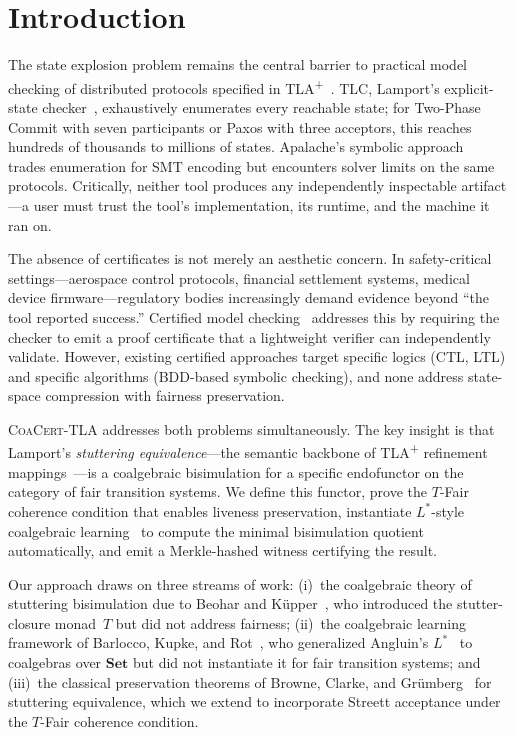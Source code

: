 \documentclass[11pt]{article}
\newcommand{\Set}{\mathbf{Set}}
\newcommand{\TFair}{$T$-Fair}
\newcommand{\CoaCert}{\textsc{CoaCert-TLA}}
\newcommand{\TLAplus}{TLA\textsuperscript{+}}
\begin{document}
\section{Introduction}
\label{sec:intro}

The state explosion problem remains the central barrier to practical model
checking of distributed protocols specified in \TLAplus{}~\cite{Lamport02}.
TLC, Lamport's explicit-state checker~\cite{TLC}, exhaustively enumerates
every reachable state; for Two-Phase Commit with seven participants or
Paxos with three acceptors, this reaches hundreds of thousands to millions
of states.
Apalache's symbolic approach~\cite{Apalache} trades enumeration for SMT
encoding but encounters solver limits on the same protocols.
Critically, neither tool produces any independently inspectable
artifact---a user must trust the tool's implementation, its runtime, and the
machine it ran on.

The absence of certificates is not merely an aesthetic concern.
In safety-critical settings---aerospace control protocols, financial
settlement systems, medical device firmware---regulatory bodies increasingly
demand evidence beyond ``the tool reported success.''
Certified model checking~\cite{Namjoshi01} addresses this by requiring the
checker to emit a proof certificate that a lightweight verifier can
independently validate.
However, existing certified approaches target specific logics (CTL, LTL)
and specific algorithms (BDD-based symbolic checking), and none address
state-space compression with fairness preservation.

\CoaCert{} addresses both problems simultaneously.
The key insight is that Lamport's \emph{stuttering equivalence}---the semantic
backbone of \TLAplus{} refinement mappings~\cite{Lamport94}---is a
coalgebraic bisimulation for a specific endofunctor on the category of fair
transition systems.
We define this functor, prove the \TFair{} coherence condition that enables
liveness preservation, instantiate $L^*$-style coalgebraic
learning~\cite{BarloccoKR19} to compute the minimal bisimulation quotient
automatically, and emit a Merkle-hashed witness certifying the result.

Our approach draws on three streams of work:
(i)~the coalgebraic theory of stuttering bisimulation due to
Beohar and K\"upper~\cite{BeoharK17}, who introduced the stutter-closure
monad~$T$ but did not address fairness;
(ii)~the coalgebraic learning framework of
Barlocco, Kupke, and Rot~\cite{BarloccoKR19}, who generalized Angluin's
$L^*$~\cite{Angluin87} to coalgebras over $\Set$ but did not instantiate it
for fair transition systems; and
(iii)~the classical preservation theorems of Browne, Clarke, and
Gr\"umberg~\cite{BrowneCG88} for stuttering equivalence, which we extend
to incorporate Streett acceptance under the \TFair{} coherence condition.
\end{document}
